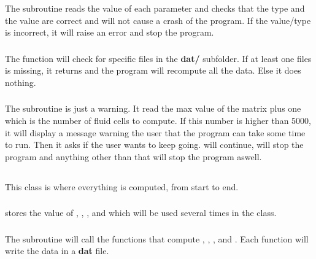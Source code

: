\subsubsection{\textcolor{func}{}}
The subroutine \textcolor{func}{} reads the value of each
parameter and checks that the type and the value are correct and will not cause
a crash of the program. If the value/type is incorrect, it will raise an error
and stop the program.

\subsubsection{\textcolor{func}{}}
The function \textcolor{func}{} will check for specific
files in the \textbf{dat/} subfolder. If at least one files is missing, it
returns  and the program will recompute all the data. Else it does
nothing.

\subsubsection{\textcolor{func}{}}
The subroutine \textcolor{func}{} is just a warning. It read the max value of
the matrix  plus one which is the number of fluid cells to compute.
If this number is higher than 5000, it will display a message warning the user
that the program can take some time to run. Then it asks if the user wants to
keep going.  will continue,  will stop the program and
anything other than that will stop the program aswell.

\subsection{}
This class is where everything is computed, from start to end.

\subsubsection{\textcolor{func}{}}
\textcolor{func}{} stores the value of , , ,  and
 which will be used several times in the class.

\subsubsection{\textcolor{func}{}}
The subroutine \textcolor{func}{} will call the functions that compute ,
, ,  and . Each function
will write the data in a \textbf{dat} file.

